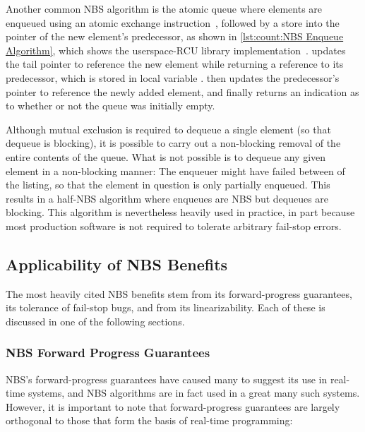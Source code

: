 \begin{fcvref}
Another common NBS algorithm is the atomic queue where elements are
enqueued using an atomic exchange instruction~\cite{MagedMichael1993JPDC},
followed by a store into the  pointer of the new element's
predecessor, as shown in \cref{lst:count:NBS Enqueue Algorithm},
which shows the userspace-RCU library
implementation~\cite{MathieuDesnoyers2009URCU}.
 updates the tail pointer to reference the new element while
returning a reference to its predecessor, which is stored in
local variable .
 then updates the predecessor's  pointer to
reference the newly added element, and finally 
returns an indication as to whether or not the queue was initially
empty.

Although mutual exclusion is required to dequeue a single element
(so that dequeue is blocking), it is possible to carry out a non-blocking
removal of the entire contents of the queue.
What is not possible is to dequeue any given element in a non-blocking
manner: The enqueuer might have failed between  of the
listing, so that the element in question is only partially enqueued.
This results in a half-NBS algorithm where enqueues are NBS but
dequeues are blocking.
This algorithm is nevertheless heavily used in practice, in part because
most production software is not required to tolerate arbitrary fail-stop
errors.
\end{fcvref}

\subsection{Applicability of NBS Benefits}
\label{sec:advsync:Applicability of NBS Benefits}

The most heavily cited NBS benefits stem from its forward-progress
guarantees, its tolerance of fail-stop bugs, and from its linearizability.
Each of these is discussed in one of the following sections.

\subsubsection{NBS Forward Progress Guarantees}
\label{sec:advsync:NBS Forward Progress Guarantees}

NBS's forward-progress guarantees have caused many to suggest its use in
real-time systems, and NBS algorithms are in fact used in a great many
such systems.
However, it is important to note that forward-progress guarantees are
largely orthogonal to those that form the basis of real-time programming:

